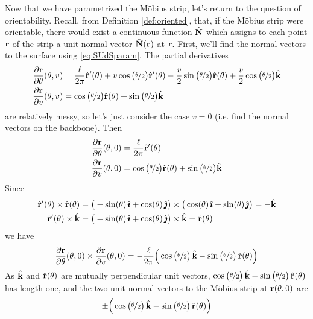 \begin{eg}
Now that we have parametrized the M\"obius strip, let's return to
the question of orientability. Recall, from Definition \ref{def:oriented},
that, if the M\"obius strip were orientable, there would exist a continuous
function $\hat{\mathbf{N}}$ which assigns to each point $\mathbf{r}$ of the strip a unit 
normal vector $\hat{\mathbf{N}}(\mathbf{r})$ at $\mathbf{r}$. First, we'll find the normal vectors
to the surface using \eqref{eq:SUdSparam}. The partial derivatives
\begin{align*}
\frac{\partial\mathbf{r}}{\partial\theta}(\theta,v)
&=\frac{\ell}{2\pi}\hat{\mathbf{r}}'(\theta) 
     + v\cos\big(\nicefrac{\theta}{2}\big) \hat{\mathbf{r}}'(\theta)
     - \frac{v}{2}\sin\big(\nicefrac{\theta}{2}\big) \hat{\mathbf{r}}(\theta)
     + \frac{v}{2}\cos\big(\nicefrac{\theta}{2}\big) \hat{\mathbf{k}}
\\
\frac{\partial\mathbf{r}}{\partial v}(\theta,v)
&=\cos\big(\nicefrac{\theta}{2}\big) \hat{\mathbf{r}}(\theta)
      + \sin\big(\nicefrac{\theta}{2}\big) \hat{\mathbf{k}}
\end{align*}
are relatively messy, so let's just consider the case $v=0$ 
(i.e. find the normal vectors on the backbone).
Then
\begin{align*}
\frac{\partial\mathbf{r}}{\partial\theta}(\theta,0)
&=\frac{\ell}{2\pi}\hat{\mathbf{r}}'(\theta) 
\\
\frac{\partial\mathbf{r}}{\partial v}(\theta,0)
&=\cos\big(\nicefrac{\theta}{2}\big) \hat{\mathbf{r}}(\theta)
      + \sin\big(\nicefrac{\theta}{2}\big) \hat{\mathbf{k}}
\end{align*}
Since
\begin{align*}
\hat{\mathbf{r}}'(\theta)\times \hat{\mathbf{r}}(\theta)
&=\big(-\sin(\theta)\,\hat{\pmb{\imath}} + \cos(\theta)\,\hat{\pmb{\jmath}}\big)\times
   \big(\cos(\theta)\,\hat{\pmb{\imath}} + \sin(\theta)\,\hat{\pmb{\jmath}}\big)
=-\hat{\mathbf{k}}
\\
\hat{\mathbf{r}}'(\theta)\times \hat{\mathbf{k}}
&=\big(-\sin(\theta)\,\hat{\pmb{\imath}} + \cos(\theta)\,\hat{\pmb{\jmath}}\big)\times \hat{\mathbf{k}}
=\hat{\mathbf{r}}(\theta)
\end{align*}
we have
\begin{align*}
\frac{\partial\mathbf{r}}{\partial\theta}(\theta,0) \times 
\frac{\partial\mathbf{r}}{\partial v}(\theta,0)
=-\frac{\ell}{2\pi}\Big(\cos\big(\nicefrac{\theta}{2}\big)\,\hat{\mathbf{k}}
                       -\sin\big(\nicefrac{\theta}{2}\big)\,\hat{\mathbf{r}}(\theta) \Big)
\end{align*}
As $\hat{\mathbf{k}}$ and $\hat{\mathbf{r}}(\theta)$ are mutually perpendicular unit vectors,
$\cos\big(\nicefrac{\theta}{2}\big)\,\hat{\mathbf{k}}
                       -\sin\big(\nicefrac{\theta}{2}\big)\,\hat{\mathbf{r}}(\theta)$ 
has length one, and the two unit normal vectors to the M\"obius strip
at $\mathbf{r}(\theta,0)$ are
\begin{equation*}
\pm \Big(\cos\big(\nicefrac{\theta}{2}\big)\,\hk
                       -\sin\big(\nicefrac{\theta}{2}\big)\,\hr(\theta) \Big)

\end{equation*}
\end{eg}
